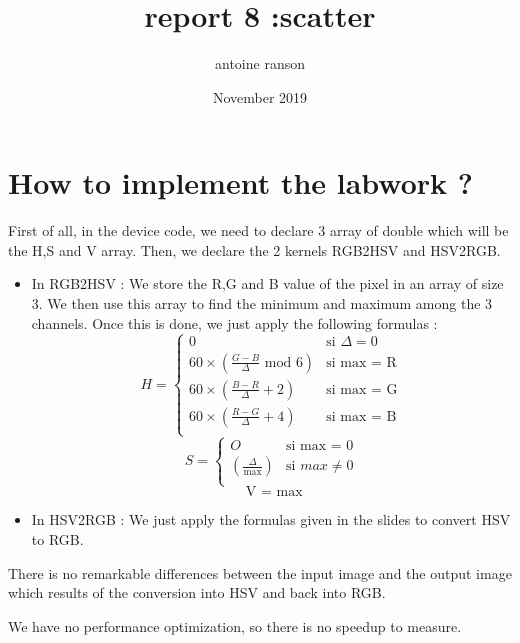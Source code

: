 \documentclass{article}
\title{report 8 :scatter}
\author{antoine ranson }
\date{November 2019}
\begin{document}
 
\maketitle 
\section{How to implement the labwork ?} 

First of all, in the device code, we need to declare 3 array of double which will be the H,S and V array. 
Then, we declare the 2 kernels RGB2HSV and HSV2RGB. 
\begin{itemize}
    \item In RGB2HSV :\newline
    We store the R,G and B value of the pixel in an array of size 3. We then use this array to find the minimum 
and maximum among the 3 channels.\newline
    Once this is done, we just apply the following formulas :
    \begin{equation}
        H =
        \begin{cases}
        0 & \text{si } \Delta =0 \\
        60\times(\frac{G-B}{\Delta} \text{ mod } 6) & \text{si max = R}\\
        60\times(\frac{B-R}{\Delta} +2) & \text{si max = G}\\
        60\times(\frac{R-G}{\Delta} +4) & \text{si max = B}\\
        \end{cases}
        \end{equation}
        \begin{equation}
        S =
        \begin{cases}
        O & \text{si max = 0}\\
        (\frac{\Delta}{\text{max}}) & \text{si } max \ne 0\\
        \end{cases}
        \end{equation}
        \newline
        \begin{equation}
            \text{ V = max}
        \end{equation}
        
    \item In HSV2RGB :\newline
    We just apply the formulas given in the slides to convert HSV to RGB.
    
\end{itemize}
   
 There is no remarkable differences between the input image and the output image which results of the 
conversion into HSV and back into RGB. \newline\newline 

We have no performance optimization, so there is no 
speedup to measure.
\end{document}
